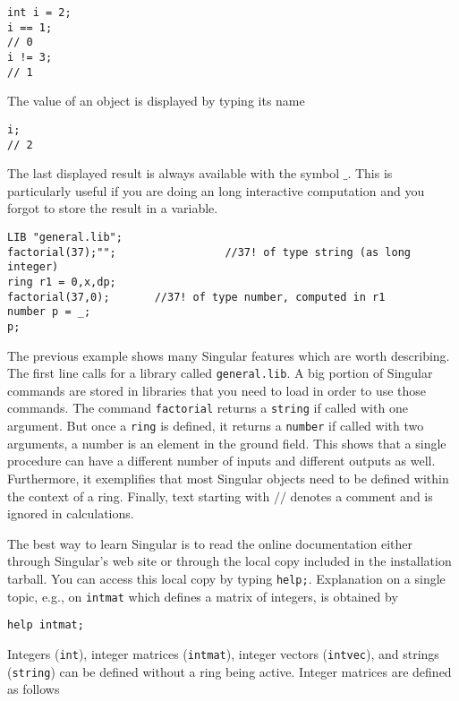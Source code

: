 \documentclass[12pt]{amsart}
\begin{document}
\begin{verbatim}
int i = 2;
i == 1;
// 0
i != 3;
// 1
\end{verbatim}

The value of an object is displayed by typing its name

\begin{verbatim}
i;
// 2
\end{verbatim}


The last displayed result is always available with the symbol $\_$. This is particularly useful
if you are doing an long interactive computation and you forgot to store the result in a variable.

\begin{verbatim}
LIB "general.lib";
factorial(37);"";                 //37! of type string (as long integer)
ring r1 = 0,x,dp;
factorial(37,0);       //37! of type number, computed in r1
number p = _;
p;
\end{verbatim}   

The previous example shows many Singular features which are worth describing. The first line calls for a library
called \texttt{general.lib}. A big portion of Singular commands are stored in libraries that you need to load in order
to use those commands. The command \texttt{factorial} returns a \texttt{string} if called with one argument. But once 
a \texttt{ring} is defined, it returns a \texttt{number} if called with two arguments, a number is an element in the ground field.
This shows that a single procedure
can have a different number of inputs and different outputs as well. Furthermore, it exemplifies that most Singular objects
need to be defined within the context of a  ring. Finally,
text starting with $//$ denotes a comment and is ignored in calculations.

The best way to learn Singular is to read the online documentation either through Singular's web site or 
through the local copy included in the installation tarball. You can access this local copy by typing
\verb|help;|. Explanation on a single topic, e.g., on \texttt{intmat} which defines a matrix of integers, is
obtained by

\begin{verbatim}
help intmat;
\end{verbatim} 

Integers (\texttt{int}), integer matrices (\texttt{intmat}), integer vectors (\texttt{intvec}), 
and strings (\texttt{string}) can be defined without a ring being active. Integer matrices are defined as follows
\end{document}
